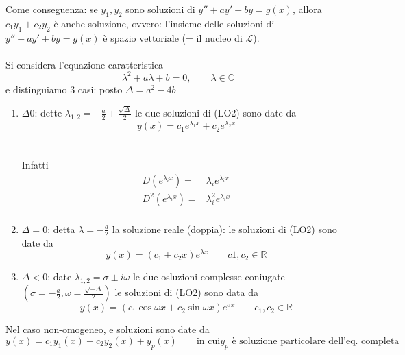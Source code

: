 \documentclass[x11names]{article}
\begin{document}
	\noindent
	Come conseguenza: se $y_1,y_2$ sono soluzioni di $	y'' + ay' + by = g(x)$, allora $c_1y_1 + c_2y_2$ è anche soluzione, ovvero:
 l'insieme delle soluzioni di 	$y'' + ay' + by = g(x)$ è spazio vettoriale (= il nucleo di $\mathcal{L}$). \\ \\
 
\noindent
Si considera l'equazione caratteristica
\[
\lambda^2 + a \lambda + b = 0, \qquad \lambda \in \mathbb{C}
\]
e distinguiamo 3 casi: posto $\Delta = a^2 - 4b$

\begin{enumerate}
	\item $\Delta 0$: dette $\lambda_{1,2} = - \frac{a}{2} \pm \frac{\sqrt{\Delta}}{2}$ le due soluzioni di (LO2) sono date da 
	\[
	y(x) = c_1 e^{\lambda_1 x} + c_2 e^{\lambda_2 x} 
	\] \\ \\
	
	\noindent
	Infatti 
	\begin{align*}
		D\left(e^{\lambda_i x}\right) =& \lambda_i e^{\lambda_i x} \\ 
		D^2\left(e^{\lambda_i x}\right) =& \lambda_i^2 e^{\lambda_i x} \\ 
	\end{align*}
	\item $\Delta = 0$: detta $\lambda = - \frac{a}{2}$ la soluzione reale (doppia): le soluzioni di (LO2) sono date da 
	\[
	y(x) = \left(c_1 + c_2x\right)e^{\lambda x} \qquad c1, c_2 \in \mathbb{R}
	\]
	\item $\Delta < 0$: date $\lambda_{1,2} = \sigma \pm i \omega$ le due osluzioni complesse coniugate $\left(\sigma = - \frac{a}{2}, \omega = \frac{\sqrt{-\Delta}}{2}\right)$ le soluzioni di (LO2) sono data da
	\[
	y(x) = \left(c_1\cos{\omega x} + c_2 \sin{\omega x}\right) e^{\sigma x} \qquad c_1,c_2 \in \mathbb{R}
	\]
\end{enumerate} 

Nel caso non-omogeneo, e soluzioni sono date da 
\[
y(x) = c_1y_1(x) + c_2y_2(x) + y_p(x) \qquad \text{in cui} y_p \text{ è soluzione particolare dell'eq. completa}
\]
\end{document}
